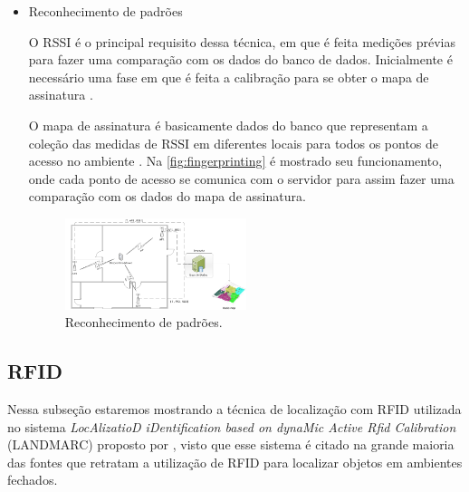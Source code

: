 \begin{itemize}
\begin{figure}[H]
        \end{figure}
       \par
        Na \autoref{fig:trilateracao} é mostrado que há uma a comunicação entre os pontos de acesso para assim poder efetuar os cálculos, esses cálculos são uma forma de saber a TDOA para assim estimar a posição do objeto \cite{wifiFernandes}.
        
        \item {Reconhecimento de padrões }
        \par
        O RSSI é o principal requisito dessa técnica, em que é feita medições prévias para fazer uma comparação com os dados do banco de dados. Inicialmente é necessário uma fase em que é feita a calibração para se obter o mapa de assinatura \cite{wifiFernandes}.
        
        \par
        O mapa de assinatura é basicamente dados do banco que representam a coleção das medidas de RSSI em diferentes locais para todos os pontos de acesso no ambiente \cite{wifiFernandes}. Na \autoref{fig:fingerprinting} é mostrado seu funcionamento, onde cada ponto de acesso se comunica com o servidor para assim fazer uma comparação com os dados do mapa de assinatura.
         \begin{figure}[H]
              \caption{\label{fig:fingerprinting}{Reconhecimento de padrões.}}
              \centering
              \includegraphics[width=0.5\textwidth]{Figuras/fingerprinting.PNG}
        \end{figure}
    \end{itemize}

    \subsection{RFID}
    \par
    Nessa subseção estaremos mostrando a técnica de localização com RFID utilizada no sistema \textit{LocAlizatioD iDentification based on dynaMic Active Rfid Calibration} (LANDMARC) proposto por \citeauthor{landmarc}, visto que esse sistema é citado na grande maioria das fontes que retratam a utilização de RFID para localizar objetos em ambientes fechados.
    

